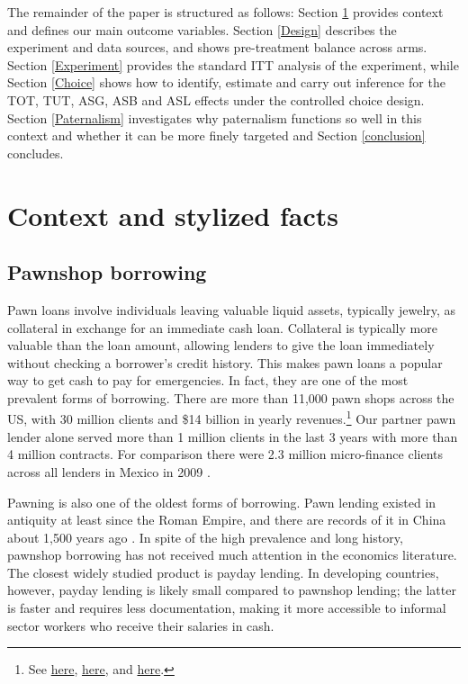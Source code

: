 \documentclass[12pt, a4paper]{article}
\begin{document}
The remainder of the paper is structured as follows:  Section \ref{context} provides context and defines our main outcome variables. Section \ref{Design} describes the experiment and data sources, and shows pre-treatment balance across arms. Section \ref{Experiment} provides the standard ITT analysis of the experiment, while Section \ref{Choice} shows how to identify, estimate and carry out inference for the TOT, TUT, ASG, ASB and ASL effects under the controlled choice design. Section \ref{Paternalism} investigates why paternalism functions so well in this context and whether it can be more finely targeted and Section \ref{conclusion} concludes.




\section{Context and stylized facts} \label{context}

\subsection{Pawnshop borrowing}
    
Pawn loans involve individuals leaving valuable liquid assets, typically jewelry, as collateral in exchange for an immediate cash loan. Collateral is typically more valuable than the loan amount, allowing lenders to give the loan immediately without checking a borrower's credit history. This makes pawn loans a popular way to get cash to pay for emergencies. In fact, they are one of the most prevalent forms of borrowing. There are more than 11,000 pawn shops across the US, with 30 million clients and \$14 billion in yearly revenues.\footnote{See
\href{https://tinyurl.com/ybm56dpe}{here}, \href{https://tinyurl.com/y9zdcgws}{here}, and \href{https://tinyurl.com/y59ptdam}{here}.}
Our partner pawn lender alone served more than 1 million clients in the last 3 years with more than 4 million contracts. For comparison there were 2.3 million micro-finance clients across all lenders in Mexico in 2009 \citep{Pedroza:2010}. 

Pawning is also one of the oldest forms of borrowing. Pawn lending existed in antiquity at least since the Roman Empire, and there are records of it in China about 1,500 years ago \citep{PawnShops}. In spite of the high prevalence and long history, pawnshop borrowing has not received much attention in the economics literature. The closest widely studied product is payday lending. In developing countries, however, payday lending is likely small compared to pawnshop lending; the latter is faster and requires less documentation, making it more accessible to informal sector workers who receive their salaries in cash. %
\end{document}
